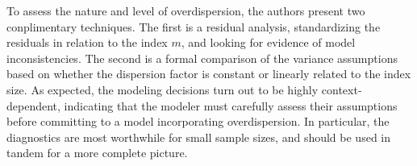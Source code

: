 \documentclass[11pt]{article}
\renewcommand\;{\,}
\begin{document}
To assess the nature and level of overdispersion, the authors present two conplimentary techniques. The first is a residual analysis, standardizing the residuals in relation to the index $m$, and looking for evidence of model inconsistencies. The second is a formal comparison of the variance assumptions based on whether the dispersion factor is constant or linearly related to the index size. As expected, the modeling decisions turn out to be highly context-dependent, indicating that the modeler must carefully assess their assumptions before committing to a model incorporating overdispersion. In particular, the diagnostics are most worthwhile for small sample sizes, and should be used in tandem for a more complete picture. 
\end{document}
